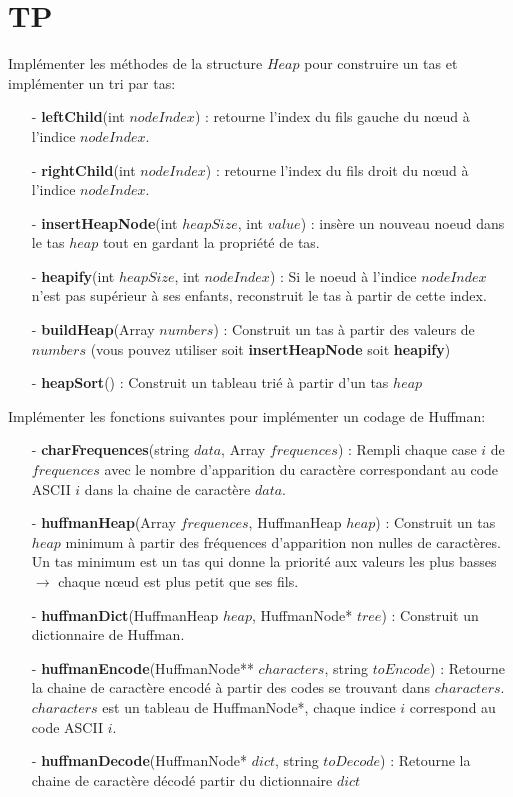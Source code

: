 \documentclass[11pt]{extarticle}
\begin{document}
\section{TP}
\noindent
Implémenter les méthodes de la structure $Heap$ pour construire un tas et implémenter un tri par tas:
\begin{itemize}
\item[ - \textbf{leftChild}(int $nodeIndex$)]: retourne l'index du fils gauche du nœud à l'indice $nodeIndex$.
\item[ - \textbf{rightChild}(int $nodeIndex$)]: retourne l'index du fils droit du nœud à l'indice $nodeIndex$.
\item[ - \textbf{insertHeapNode}(int $heapSize$, int $value$)]: insère un nouveau noeud dans le tas $heap$ tout en gardant la propriété de tas.
\item[ - \textbf{heapify}(int $heapSize$, int $nodeIndex$)]: Si le noeud à l'indice $nodeIndex$ n'est pas supérieur à ses enfants, reconstruit le tas à partir de cette index.
\item[ - \textbf{buildHeap}(Array $numbers$)]: Construit un tas à partir des valeurs de $numbers$ (vous pouvez utiliser soit \textbf{insertHeapNode} soit \textbf{heapify})
\item[ - \textbf{heapSort}()]: Construit un tableau trié à partir d'un tas $heap$
\end{itemize}
Implémenter les fonctions suivantes pour implémenter un codage de Huffman:
\begin{itemize}

\item[ - \textbf{charFrequences}(string $data$, Array $frequences$)]: Rempli chaque case $i$ de $frequences$ avec le nombre d'apparition du caractère correspondant au code ASCII $i$ dans la chaine de caractère $data$.
\item[ - \textbf{huffmanHeap}(Array $frequences$, HuffmanHeap $heap$)]: Construit un tas $heap$ minimum à partir des fréquences d'apparition non nulles de caractères. Un tas minimum est un tas qui donne la priorité aux valeurs les plus basses $\rightarrow$ chaque nœud est plus petit que ses fils.
\item[ - \textbf{huffmanDict}(HuffmanHeap $heap$, HuffmanNode* $tree$)]: Construit un dictionnaire de Huffman.
\item[ - \textbf{huffmanEncode}(HuffmanNode** $characters$, string $toEncode$)]: Retourne la chaine de caractère encodé à partir des codes se trouvant dans $characters$. $characters$ est un tableau de HuffmanNode*, chaque indice $i$ correspond au code ASCII $i$. 
\item[ - \textbf{huffmanDecode}(HuffmanNode* $dict$, string $toDecode$)]: Retourne la chaine de caractère décodé partir du dictionnaire $dict$
\end{itemize}
\end{document}
